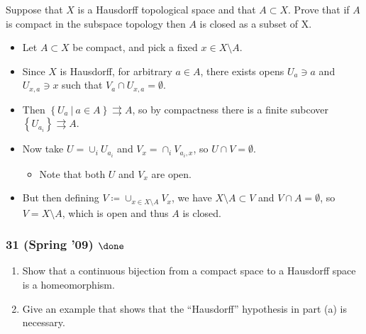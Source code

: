 \begin{problem}[?]

Suppose that \(X\) is a Hausdorff topological space and that
\(A \subset X\). Prove that if \(A\) is compact in the subspace topology
then \(A\) is closed as a subset of X.

\end{problem}

\begin{solution}

\envlist

\begin{itemize}
\item
  Let \(A \subset X\) be compact, and pick a fixed
  \(x\in X\setminus A\).
\item
  Since \(X\) is Hausdorff, for arbitrary \(a\in A\), there exists opens
  \(U_{a} \ni a\) and \(U_{x,a}\ni x\) such that
  \(V_{a} \cap U_{x,a} = \emptyset\).
\item
  Then
  \(\left\{{U_{a} {~\mathrel{\Big|}~}a\in A}\right\} \rightrightarrows A\),
  so by compactness there is a finite subcover
  \(\left\{{U_{a_i}}\right\} \rightrightarrows A\).
\item
  Now take \(U = \cup_i U_{a_i}\) and \(V_x = \cap_i V_{a_i, x}\), so
  \(U\cap V = \emptyset\).

  \begin{itemize}
  \tightlist
  \item
    Note that both \(U\) and \(V_x\) are open.
  \end{itemize}
\item
  But then defining \(V \coloneqq\cup_{x\in X\setminus A} V_x\), we have
  \(X\setminus A \subset V\) and \(V\cap A = \emptyset\), so
  \(V = X\setminus A\), which is open and thus \(A\) is closed.
\end{itemize}

\end{solution}

\hypertarget{spring-09-done}{%
\subsubsection{\texorpdfstring{31 (Spring '09)
\(\done\)}{31 (Spring '09) \textbackslash done}}\label{spring-09-done}}

\begin{problem}[Spring 2009, 31]

\envlist

\begin{enumerate}
\def\labelenumi{\alph{enumi}.}
\item
  Show that a continuous bijection from a compact space to a Hausdorff
  space is a homeomorphism.
\item
  Give an example that shows that the ``Hausdorff'' hypothesis in part
  (a) is necessary.
\end{enumerate}

\end{problem}

